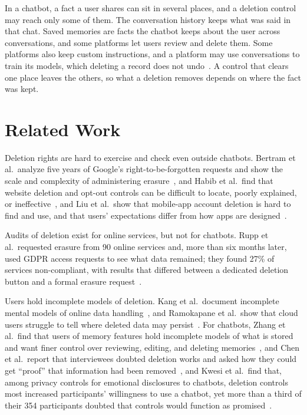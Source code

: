 \documentclass[conference,compsoc]{IEEEtran}
\begin{document}
In a chatbot, a fact a user shares can sit in several places, and a deletion control may reach only some of them. The conversation history keeps what was said in that chat. Saved memories are facts the chatbot keeps about the user across conversations, and some platforms let users review and delete them. Some platforms also keep custom instructions, and a platform may use conversations to train its models, which deleting a record does not undo~\cite{bourtoule2021machine}. A control that clears one place leaves the others, so what a deletion removes depends on where the fact was kept.

\section{Related Work}
\label{sec:related}

Deletion rights are hard to exercise and check even outside chatbots. Bertram et al.\ analyze five years of Google's right-to-be-forgotten requests and show the scale and complexity of administering erasure~\cite{bertram2019five}, and Habib et al.\ find that website deletion and opt-out controls can be difficult to locate, poorly explained, or ineffective~\cite{habib2019empirical}, and Liu et al.\ show that mobile-app account deletion is hard to find and use, and that users' expectations differ from how apps are designed~\cite{liu2022zombie}.

Audits of deletion exist for online services, but not for chatbots. Rupp et al.\ requested erasure from 90 online services and, more than six months later, used GDPR access requests to see what data remained; they found 27\% of services non-compliant, with results that differed between a dedicated deletion button and a formal erasure request~\cite{rupp2022leave}.

Users hold incomplete models of deletion. Kang et al.\ document incomplete mental models of online data handling~\cite{kang2015mydata}, and Ramokapane et al.\ show that cloud users struggle to tell where deleted data may persist~\cite{ramokapane2017stupid}. For chatbots, Zhang et al.\ find that users of memory features hold incomplete models of what is stored and want finer control over reviewing, editing, and deleting memories~\cite{zhang2025understanding}, and Chen et al.\ report that interviewees doubted deletion works and asked how they could get ``proof'' that information had been removed~\cite{chen2026relational}, and Kwesi et al.\ find that, among privacy controls for emotional disclosures to chatbots, deletion controls most increased participants' willingness to use a chatbot, yet more than a third of their 354 participants doubted that controls would function as promised~\cite{kwesi2026impact}.
\end{document}
